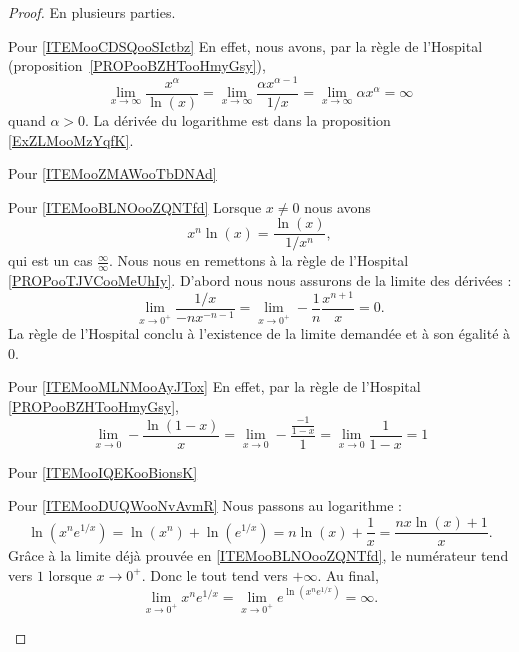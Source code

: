 \begin{proof}
    En plusieurs parties.
    \begin{subproof}
        \item[Pour \ref{ITEMooCDSQooSIctbz}]
            En effet, nous avons, par la règle de l'Hospital (proposition~\ref{PROPooBZHTooHmyGsy}),
            \begin{equation}
                \lim_{x\to\infty} \frac{ x^{\alpha} }{ \ln(x) }=\lim_{x\to\infty} \frac{ \alpha x^{\alpha-1} }{ 1/x }=\lim_{x\to\infty} \alpha x^{\alpha}=\infty
            \end{equation}
            quand $\alpha>0$. La dérivée du logarithme est dans la proposition \ref{ExZLMooMzYqfK}.
        \item[Pour \ref{ITEMooZMAWooTbDNAd}]
        \item[Pour \ref{ITEMooBLNOooZQNTfd}]
            Lorsque \( x\neq 0\) nous avons
            \begin{equation}
                x^n\ln(x)=\frac{ \ln(x) }{ 1/x^n },
            \end{equation}
            qui est un cas \( \frac{ \infty }{ \infty }\). Nous nous en remettons à la règle de l'Hospital \ref{PROPooTJVCooMeUhIy}. D'abord nous nous assurons de la limite des dérivées :
            \begin{equation}
                \lim_{x\to 0^+} \frac{ 1/x }{ -nx^{-n-1} }=\lim_{x\to 0^+} -\frac{1}{ n }\frac{ x^{n+1} }{ x }=0.
            \end{equation}
            La règle de l'Hospital conclu à l'existence de la limite demandée et à son égalité à \( 0\).
        \item[Pour \ref{ITEMooMLNMooAyJTox}]
            En effet, par la règle de l'Hospital \ref{PROPooBZHTooHmyGsy},
            \begin{equation}    \label{EqGICpOX}
                \lim_{x\to 0} -\frac{ \ln(1-x) }{ x }=\lim_{x\to 0} -\frac{ \frac{ -1 }{ 1-x } }{ 1 }=\lim_{x\to 0} \frac{1}{ 1-x }=1
            \end{equation}
        \item[Pour \ref{ITEMooIQEKooBionsK}]
        \item[Pour \ref{ITEMooDUQWooNvAvmR}]
            Nous passons au logarithme :
            \begin{equation}
                \ln(x^n e^{1/x})=\ln(x^n)+\ln( e^{1/x})=n\ln(x)+\frac{1}{ x }=\frac{ n x\ln(x)+1 }{ x }.
            \end{equation}
            Grâce à la limite déjà prouvée en \ref{ITEMooBLNOooZQNTfd}, le numérateur tend vers \( 1\) lorsque \( x\to 0^+\). Donc le tout tend vers \( +\infty\). Au final,
            \begin{equation}
                \lim_{x\to 0^+} x^n e^{1/x}=\lim_{x\to 0^+}  e^{\ln(x^n e^{1/x})}=\infty.
            \end{equation}
    \end{subproof}
\end{proof}

